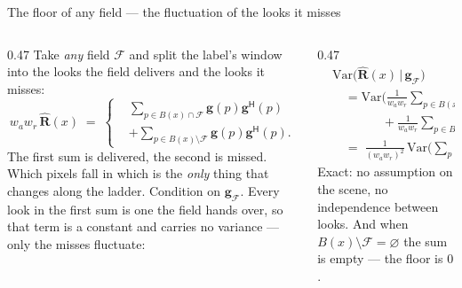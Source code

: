 \begin{frame}{The floor of any field --- the fluctuation of the looks it misses}
  \begin{columns}[c]
    \begin{column}{0.47\textwidth}
      \small
      \setlength{\abovedisplayskip}{11pt}
      \setlength{\belowdisplayskip}{22pt}
      Take \emph{any} field $\mathcal{F}$ and split the label's window into the
      looks the field delivers and the looks it misses:
      \[
        w_{a}w_{r}\,\hat{\mathbf{R}}(x) \;=\; \left\{
        \begin{aligned}
          & \sum_{p \in B(x) \cap \mathcal{F}} \mathbf{g}(p)\mathbf{g}^{\mathsf H}(p) \\[2pt]
          & + \sum_{p \in B(x) \setminus \mathcal{F}} \mathbf{g}(p)\mathbf{g}^{\mathsf H}(p).
        \end{aligned}
        \right.
      \]
      The first sum is delivered, the second is missed. Which pixels fall in which
      is the \emph{only} thing that changes along the ladder.
      Condition on $\mathbf{g}_{\mathcal{F}}$. Every look in the first sum is one
      the field hands over, so that term is a constant and carries no variance ---
      only the misses fluctuate:
    \end{column}
    \begin{column}{0.47\textwidth}
      \small
      \setlength{\abovedisplayskip}{11pt}
      \setlength{\belowdisplayskip}{22pt}
      \[
        \begin{aligned}
          &\mathrm{Var}\big(\hat{\mathbf{R}}(x) \,\big|\, \mathbf{g}_{\mathcal{F}}\big) \\[5pt]
          &\quad = \mathrm{Var}\bigg(\frac{1}{w_{a}w_{r}}\sum_{p \in B(x) \cap \mathcal{F}} \mathbf{g}(p)\mathbf{g}^{\mathsf H}(p) \\[2pt]
          &\qquad\qquad + \frac{1}{w_{a}w_{r}}\sum_{p \in B(x) \setminus \mathcal{F}} \mathbf{g}(p)\mathbf{g}^{\mathsf H}(p)
            \,\bigg|\, \mathbf{g}_{\mathcal{F}}\bigg) \\[5pt]
          &\quad = \boxed{\;\frac{1}{(w_{a}w_{r})^{2}}\,\mathrm{Var}\bigg(
            \sum_{p \in B(x) \setminus \mathcal{F}} \mathbf{g}(p)\mathbf{g}^{\mathsf H}(p)
            \,\bigg|\, \mathbf{g}_{\mathcal{F}}\bigg)\;}
        \end{aligned}
      \]
      Exact: no assumption on the scene, no independence between looks. And when
      $B(x) \setminus \mathcal{F} = \varnothing$ the sum is empty --- the floor is
      $0$.
    \end{column}
  \end{columns}
\end{frame}

